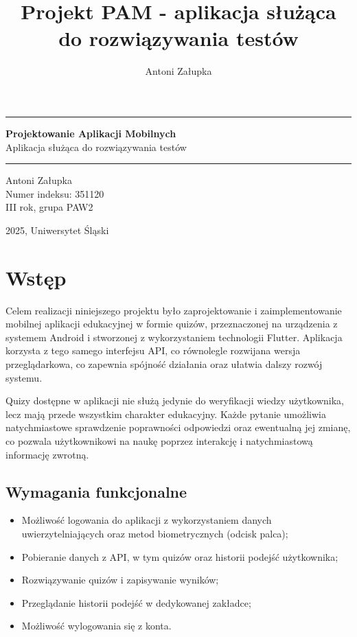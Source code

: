 \documentclass{article}
\title{Projekt PAM - aplikacja służąca do rozwiązywania testów}
\author{Antoni Załupka}
\begin{document}
	\thispagestyle{empty}
	
	
	\vspace{4cm}
	
	\rule{\linewidth}{2mm} 
	
	\begin{center}
		\huge \textbf{Projektowanie Aplikacji Mobilnych} \\
		\huge {Aplikacja służąca do rozwiązywania testów} \\
	\end{center}
	
	\rule{\linewidth}{0.5mm} 
	
	\vspace{2cm}
	
	\begin{center}
		\Large{Antoni Załupka} \\
		\Large{Numer indeksu: 351120} \\
		\Large{III rok, grupa PAW2} \\
		
	\end{center}
	
	
	\vspace{15cm}
	
	\begin{center}
		\Large{2025, Uniwersytet Śląski}
	\end{center}
	
	\newpage
	
	\section{Wstęp}
		Celem realizacji niniejszego projektu było zaprojektowanie i zaimplementowanie mobilnej aplikacji edukacyjnej w formie quizów, przeznaczonej na urządzenia z systemem Android i stworzonej z wykorzystaniem technologii Flutter. Aplikacja korzysta z tego samego interfejsu API, co równolegle rozwijana wersja przeglądarkowa, co zapewnia spójność działania oraz ułatwia dalszy rozwój systemu.
		
		Quizy dostępne w aplikacji nie służą jedynie do weryfikacji wiedzy użytkownika, lecz mają przede wszystkim charakter edukacyjny. Każde pytanie umożliwia natychmiastowe sprawdzenie poprawności odpowiedzi oraz ewentualną jej zmianę, co pozwala użytkownikowi na naukę poprzez interakcję i natychmiastową informację zwrotną.
		
		\subsection*{Wymagania funkcjonalne}
		\begin{itemize}
			\item Możliwość logowania do aplikacji z wykorzystaniem danych uwierzytelniających oraz metod biometrycznych (odcisk palca);
			\item Pobieranie danych z API, w tym quizów oraz historii podejść użytkownika;
			\item Rozwiązywanie quizów i zapisywanie wyników;
			\item Przeglądanie historii podejść w dedykowanej zakładce;
			\item Możliwość wylogowania się z konta.
		\end{itemize}
		
\end{document}
